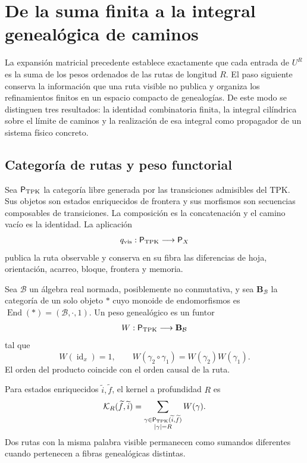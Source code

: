 \section{De la suma finita a la integral genealógica de caminos}
\label{sec:integral-genealogica-caminos-rev2}

La expansión matricial precedente establece exactamente que cada entrada de
\(U^R\) es la suma de los pesos ordenados de las rutas de longitud \(R\).
El paso siguiente conserva la información que una ruta visible no publica y
organiza los refinamientos finitos en un espacio compacto de genealogías. De
este modo se distinguen tres resultados: la identidad combinatoria finita, la
integral cilíndrica sobre el límite de caminos y la realización de esa
integral como propagador de un sistema físico concreto.

\subsection{Categoría de rutas y peso functorial}

Sea \(\mathsf P_{\rm TPK}\) la categoría libre generada por las transiciones
admisibles del TPK. Sus objetos son estados enriquecidos de frontera y sus
morfismos son secuencias composables de transiciones. La composición es la
concatenación y el camino vacío es la identidad. La aplicación
\[
 q_{\rm vis}:\mathsf P_{\rm TPK}\longrightarrow\mathsf P_X
\]
publica la ruta observable y conserva en su fibra las diferencias de hoja,
orientación, acarreo, bloque, frontera y memoria.

\begin{definition}
\label{def:peso-genealogico-caminos-rev2}
Sea \(\mathcal B\) un álgebra real normada, posiblemente no conmutativa, y
sea \(\mathbf B_{\mathcal B}\) la categoría de un solo objeto \(\ast\) cuyo
monoide de endomorfismos es
\(\operatorname{End}(\ast)=(\mathcal B,\cdot,1)\). Un peso genealógico es un funtor
\[
 W:\mathsf P_{\rm TPK}\longrightarrow\mathbf B_{\mathcal B}
\]
tal que
\[
 W(\operatorname{id}_x)=1,
 \qquad
 W(\gamma_2\circ\gamma_1)=W(\gamma_2)W(\gamma_1).
\]
El orden del producto coincide con el orden causal de la ruta.
\end{definition}

Para estados enriquecidos \(\widetilde i,\widetilde f\), el kernel a
profundidad \(R\) es
\begin{equation}
 \mathcal K_R(\widetilde f,\widetilde i)
 =\sum_{\substack{
   \gamma\in\mathsf P_{\rm TPK}(\widetilde i,\widetilde f)\\
   |\gamma|=R}}
 W(\gamma).
 \label{eq:kernel-genealogico-finito-rev2}
\end{equation}
Dos rutas con la misma palabra visible permanecen como sumandos diferentes
cuando pertenecen a fibras genealógicas distintas.

